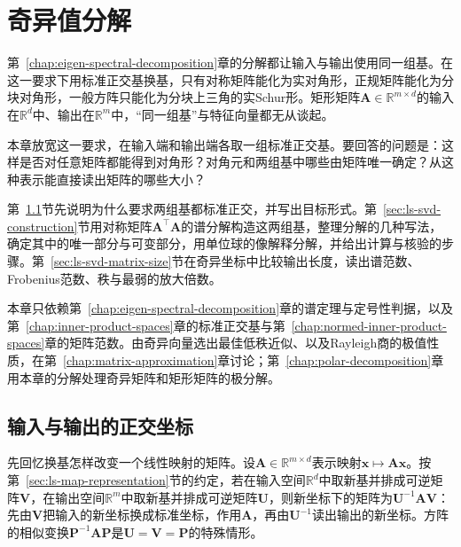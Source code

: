 
\chapter{奇异值分解}
\label{sec:ls-svd}
\label{chap:singular-value-decomposition}

第~\ref{chap:eigen-spectral-decomposition}章的分解都让输入与输出使用同一组基。在这一要求下用标准正交基换基，只有对称矩阵能化为实对角形，正规矩阵能化为分块对角形，一般方阵只能化为分块上三角的实Schur形。矩形矩阵$\bm A\in\mathbb R^{m\times d}$的输入在$\mathbb R^d$中、输出在$\mathbb R^m$中，“同一组基”与特征向量都无从谈起。

本章放宽这一要求，在输入端和输出端各取一组标准正交基。要回答的问题是：这样是否对任意矩阵都能得到对角形？对角元和两组基中哪些由矩阵唯一确定？从这种表示能直接读出矩阵的哪些大小？

第~\ref{sec:svd-orthogonal-coordinates}节先说明为什么要求两组基都标准正交，并写出目标形式。第~\ref{sec:ls-svd-construction}节用对称矩阵$\bm A^\top\bm A$的谱分解构造这两组基，整理分解的几种写法，确定其中的唯一部分与可变部分，用单位球的像解释分解，并给出计算与核验的步骤。第~\ref{sec:ls-svd-matrix-size}节在奇异坐标中比较输出长度，读出谱范数、Frobenius范数、秩与最弱的放大倍数。

本章只依赖第~\ref{chap:eigen-spectral-decomposition}章的谱定理与定号性判据，以及第~\ref{chap:inner-product-spaces}章的标准正交基与第~\ref{chap:normed-inner-product-spaces}章的矩阵范数。由奇异向量选出最佳低秩近似、以及Rayleigh商的极值性质，在第~\ref{chap:matrix-approximation}章讨论；第~\ref{chap:polar-decomposition}章用本章的分解处理奇异矩阵和矩形矩阵的极分解。

\section{输入与输出的正交坐标}
\label{sec:svd-orthogonal-coordinates}

先回忆换基怎样改变一个线性映射的矩阵。设$\bm A\in\mathbb R^{m\times d}$表示映射$\bm x\mapsto\bm A\bm x$。按第~\ref{sec:ls-map-representation}节的约定，若在输入空间$\mathbb R^d$中取新基并排成可逆矩阵$\bm V$，在输出空间$\mathbb R^m$中取新基并排成可逆矩阵$\bm U$，则新坐标下的矩阵为$\bm U^{-1}\bm A\bm V$：先由$\bm V$把输入的新坐标换成标准坐标，作用$\bm A$，再由$\bm U^{-1}$读出输出的新坐标。方阵的相似变换$\bm P^{-1}\bm A\bm P$是$\bm U=\bm V=\bm P$的特殊情形。

